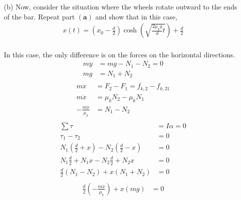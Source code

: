 \documentclass[]{article}
\begin{document}
{\begin{enumerate}
			\item[(b)] Now, consider the situation where the wheels rotate outward to the ends of the bar. Repeat part $\bm{(a)}$ and show that in this case,
			\begin{equation*}
				\begin{split}
					x(t) = \left( x_0 - \frac{d}{2} \right) \cosh( \sqrt{ \frac{2 \mu_k g}{d}t } ) + \frac{d}{2}
				\end{split}
			\end{equation*}
			\paragraph{} In this case, the only difference is on the forces on the horizontal directions.
					\begin{equation*}
					\begin{split}
						m\ddot{y} &= mg - N_1 - N_2 = 0 \\
						mg &= N_1 + N_2 \\
					\end{split}
				\end{equation*}
				\begin{equation*}
					\begin{split}
						m\ddot{x} &= F_2 - F_1 = f_{k,2} - f_{k,21} \\
						m \ddot{x} &= \mu_k N_2 - \mu_k N_1 \\
						-\frac{m\ddot{x}}{\mu_k} &= N_1 - N_2 \\
					\end{split}
				\end{equation*}
				\begin{equation*}
					\begin{split}
						\sum \tau &= I\alpha = 0 \\
						\tau_1 - \tau_2 &= 0 \\
						N_1 \left( \tfrac{d}{2} + x \right) - N_2 \left( \tfrac{d}{2} - x \right) &= 0 \\
						N_1\tfrac{d}{2} + N_1x - N_2\tfrac{d}{2} + N_2x  &= 0 \\
						\frac{d}{2} (N_1 - N_2) + x(N_1 + N_2) &= 0 \\
					\end{split}
				\end{equation*}
				\begin{equation*}
				\begin{split}
					\frac{d}{2} \left(-\frac{m\ddot{x}}{\mu_k}\right) + x(mg) &= 0 \\

\end{split}
\end{equation*}
\end{enumerate}}
\end{document}
